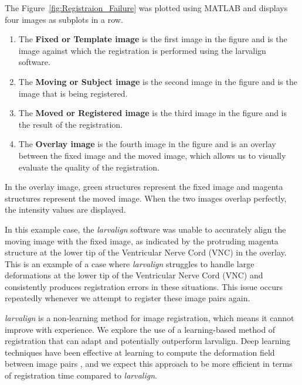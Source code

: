 \documentclass{report}
\begin{document}
	The Figure~\ref{fig:Registraion_Failure} was plotted using MATLAB and displays four images as subplots in a row. 
	\begin{enumerate}
		\item The \textbf{Fixed or Template image} is the first image in the figure and is the image against which the registration is performed using the larvalign software.
		\item The \textbf{Moving or Subject image} is the second image in the figure and is the image that is being registered.
		\item The \textbf{Moved or Registered image} is the third image in the figure and is the result of the registration.
		\item The \textbf{Overlay image} is the fourth image in the figure and is an overlay between the fixed image and the moved image, which allows us to visually evaluate the quality of the registration.
	\end{enumerate}
	
	In the overlay image, green structures represent the fixed image and magenta structures represent the moved image. When the two images overlap perfectly, the intensity values are displayed.
	
	In this example case, the \textit{larvalign} software was unable to accurately align the moving image with the fixed image, as indicated by the protruding magenta structure at the lower tip of the Ventricular Nerve Cord (VNC) in the overlay. This is an example of a case where \textit{larvalign} struggles to handle large deformations at the lower tip of the Ventricular Nerve Cord (VNC) and consistently produces registration errors in these situations. This issue occurs repeatedly whenever we attempt to register these image pairs again.
	
	\textit{larvalign} is a non-learning method for image registration, which means it cannot improve with experience. We explore the use of a learning-based method of registration that can adapt and potentially outperform larvalign. Deep learning techniques have been effective at learning to compute the deformation field between image pairs \cite{Balakrishnan_2019, de_Vos_2019, Wu, Fu_2020, 10.1007/978-3-319-66182-7_27}, and we expect this approach to be more efficient in terms of registration time compared to \textit{larvalign}.
	
\end{document}
